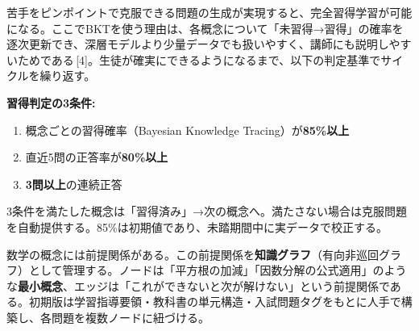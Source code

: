 \documentclass[paper=a4,fontsize=10.5bp,jafontsize=10.5bp,twocolumn]{jlreq}
\begin{document}
苦手をピンポイントで克服できる問題の生成が実現すると、完全習得学習が可能になる。ここでBKTを使う理由は、各概念について「未習得→習得」の確率を逐次更新でき、深層モデルより少量データでも扱いやすく、講師にも説明しやすいためである\,[4]。生徒が確実にできるようになるまで、以下の判定基準でサイクルを繰り返す。

\begin{graybox}
\textbf{習得判定の3条件:}
\begin{enumerate}[leftmargin=2em]
  \item 概念ごとの習得確率（Bayesian Knowledge Tracing）が\textbf{85\%以上}
  \item 直近5問の正答率が\textbf{80\%以上}
  \item \textbf{3問以上}の連続正答
\end{enumerate}
3条件を満たした概念は「習得済み」→次の概念へ。満たさない場合は克服問題を自動提供する。85\%は初期値であり、未踏期間中に実データで校正する。
\end{graybox}

数学の概念には前提関係がある。この前提関係を\textbf{知識グラフ}（有向非巡回グラフ）として管理する。ノードは「平方根の加減」「因数分解の公式適用」のような\textbf{最小概念}、エッジは「これができないと次が解けない」という前提関係である。初期版は学習指導要領・教科書の単元構造・入試問題タグをもとに人手で構築し、各問題を複数ノードに紐づける。
\end{document}
